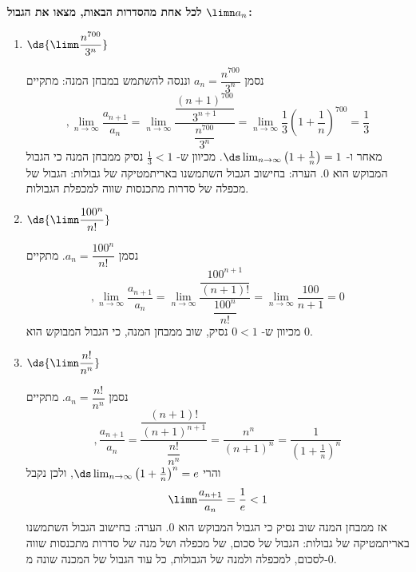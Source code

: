 \textbf{לכל אחת מהסדרות הבאות, מצאו את הגבול
$\limn a_n$:}
\begin{enumerate}
\item $\ds{\limn \dfrac{n^{700}}{3^n}}$

\begin{solbox}
    נסמן
    $a_n=\dfrac{n^{700}}{3^n}$
    וננסה להשתמש במבחן המנה:
    מתקיים
    $$,\lim_{n\to\infty}\frac{a_{n+1}}{a_n}=\lim_{n\to\infty}\frac{\dfrac{(n+1)^{700}}{3^{n+1}}}{\dfrac{n^{700}}{3^n}}=\lim_{n\to\infty}\frac{1}{3}\left(1+\frac{1}{n}\right)^{700}=\frac{1}{3}$$
    מאחר ו-
    $\ds\lim_{n\to\infty}\left(1+\frac{1}{n}\right)=1$.
    מכיוון ש-
    $\frac{1}{3}<1$
    נסיק ממבחן המנה כי הגבול המבוקש הוא
    $0$.
הערה: בחישוב הגבול השתמשנו באריתמטיקה של גבולות: הגבול של מכפלה של סדרות מתכנסות שווה למכפלת הגבולות.
\end{solbox}


    \item $\ds{\limn \dfrac{100^n}{n!}}$

\begin{solbox}
    נסמן
    $a_n=\dfrac{100^n}{n!}$.
    מתקיים
    $$,\lim_{n\to\infty}\frac{a_{n+1}}{a_n}=\lim_{n\to\infty}\frac{\dfrac{100^{n+1}}{(n+1)!}}{\dfrac{100^n}{n!}}=\lim_{n\to\infty}\frac{100}{n+1}=0$$ מכיוון ש-
    $0<1$
    נסיק, שוב ממבחן המנה, כי הגבול המבוקש הוא
    $0$.
\end{solbox}

    \item $\ds{\limn \dfrac{n!}{n^n}}$
\begin{solbox}
          נסמן
    $a_n=\dfrac{n!}{n^n}$.
    מתקיים
    $$,\frac{a_{n+1}}{a_n}=
    \frac{\dfrac{(n+1)!}{(n+1)^{n+1}}}{\dfrac{n!}{n^n}}=
    \frac{n^n}{(n+1)^n}=\frac{1}{\left(1+\frac{1}{n}\right)^n}$$
והרי
$\ds\lim_{n\to\infty}\left(1+\frac{1}{n}\right)^n=e$,
    ולכן נקבל
    $$\limn \frac{a_{n+1}}{a_n}=\frac{1}{e}<1
    $$
    אז ממבחן המנה שוב
    נסיק כי הגבול המבוקש הוא
    $0$.
הערה: בחישוב הגבול השתמשנו באריתמטיקה של גבולות: הגבול של סכום, של מכפלה ושל מנה של סדרות מתכנסות שווה לסכום, למכפלה ולמנה של הגבולות, כל עוד הגבול של המכנה שונה מ-$0$.
\end{solbox}

\eMs
\end{enumerate}
